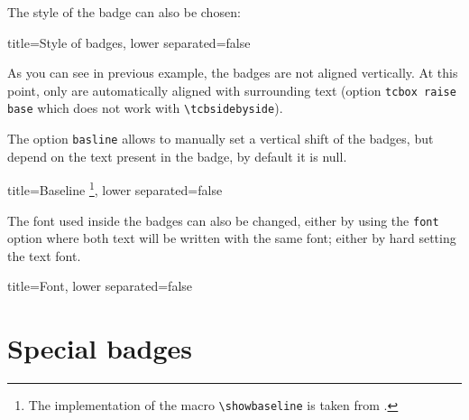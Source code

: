 \vspace{\baselineskip}

The style of the badge can also be chosen:

\begin{tcblisting}{title={Style of badges}, lower separated=false}
\end{tcblisting}

As you can see in previous example, the badges are not aligned vertically.
At this point, only  are automatically aligned with surrounding text (option \texttt{tcbox raise base} which does not work with \texttt{\textbackslash tcbsidebyside}).

The option \texttt{basline} allows to manually set a vertical shift of the badges, but depend on the text present in the badge, by default it is null.

\begin{tcblisting}{
    title={Baseline%
        \footnote{The implementation of the macro \texttt{\textbackslash showbaseline} is taken from .}},
    lower separated=false}
\end{tcblisting}

The font used inside the badges can also be changed, either by using the \texttt{font} option where both text will be written with the same font;
either by hard setting the text font.

\begin{tcblisting}{title={Font}, lower separated=false}
\end{tcblisting}



\section{Special badges}
\label{sec:special-badges}


